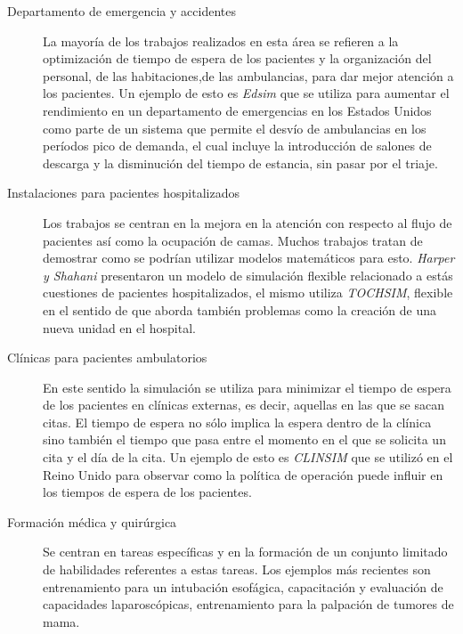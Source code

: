 \begin{description}

\item[Departamento de emergencia y accidentes] La mayoría de los trabajos
	realizados en esta área se refieren a la optimización de tiempo de
	espera de los pacientes y la organización del personal, de las
	habitaciones,de las ambulancias, para dar mejor atención a los
    pacientes. Un ejemplo de esto es \emph{Edsim} que se utiliza para aumentar
    el rendimiento en un departamento de emergencias en los Estados Unidos como
    parte de un sistema que permite el desvío de ambulancias en los períodos
    pico de demanda, el cual incluye la introducción de salones de descarga y la
    disminución del tiempo de estancia, sin pasar por el
    triaje\cite{guna:simulation}. 
	
\item[Instalaciones para pacientes hospitalizados] Los trabajos se centran en la
    mejora en la atención con respecto al flujo de pacientes así como la
    ocupación de camas. Muchos trabajos tratan de demostrar como se podrían
    utilizar modelos matemáticos para esto. \emph{Harper y Shahani} presentaron
    un modelo de simulación flexible relacionado a estás cuestiones de pacientes
    hospitalizados, el mismo utiliza \emph{TOCHSIM}, flexible en el sentido de
    que aborda también problemas como la creación de una nueva unidad en el
    hospital\cite{guna:simulation}.

\item[Clínicas para pacientes ambulatorios] En este sentido la simulación se
	utiliza para minimizar el tiempo de espera de los pacientes en clínicas
	externas, es decir, aquellas en las que se sacan citas. El tiempo de
	espera no sólo implica la espera dentro de la clínica sino también el
    tiempo que pasa entre el momento en el que se solicita un cita y el día de
    la cita. Un ejemplo de esto es \emph{CLINSIM} que se utilizó en el Reino
    Unido para observar como la política de operación puede influir en los
    tiempos de espera de los pacientes\cite{guna:simulation}. 

\item[Formación médica y quirúrgica] Se centran en tareas específicas y en la
	formación de un conjunto limitado de habilidades referentes a estas
	tareas. Los ejemplos más recientes son entrenamiento para un intubación
	esofágica, capacitación y evaluación de capacidades laparoscópicas,
	entrenamiento para la palpación de tumores de mama\cite{mantovani:vr}. 


\end{description}
